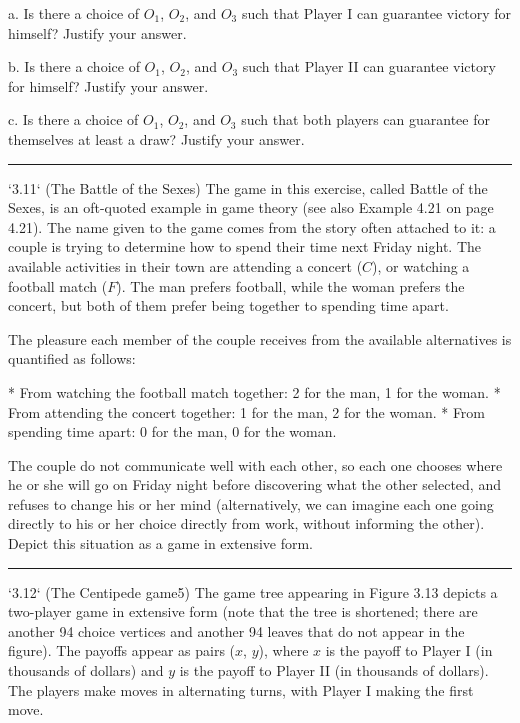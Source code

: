 \documentclass[10pt]{report}
\begin{document}
a. Is there a choice of $O_{1}$, $O_{2}$, and $O_{3}$ such that Player I can guarantee victory for himself? Justify your answer.

b. Is there a choice of $O_{1}$, $O_{2}$, and $O_{3}$ such that Player II can guarantee victory for himself? Justify your answer.

c. Is there a choice of $O_{1}$, $O_{2}$, and $O_{3}$ such that both players can guarantee for themselves at least a draw? Justify your answer.

\vspace{0.5cm}
\hrule
\vspace{0.5cm}
`3.11` (The Battle of the Sexes) The game in this exercise, called Battle of the Sexes, is an oft-quoted example in game theory (see also Example 4.21 on page 4.21). The name given to the game comes from the story often attached to it: a couple is trying to determine how to spend their time next Friday night. The available activities in their town are attending a concert ($C$), or watching a football match ($F$). The man prefers football, while the woman prefers the concert, but both of them prefer being together to spending time apart.

The pleasure each member of the couple receives from the available alternatives is quantified as follows:

* From watching the football match together: 2 for the man, 1 for the woman.
* From attending the concert together: 1 for the man, 2 for the woman.
* From spending time apart: 0 for the man, 0 for the woman.

The couple do not communicate well with each other, so each one chooses where he or she will go on Friday night before discovering what the other selected, and refuses to change his or her mind (alternatively, we can imagine each one going directly to his or her choice directly from work, without informing the other). Depict this situation as a game in extensive form.

\vspace{0.5cm}
\hrule
\vspace{0.5cm}
`3.12` (The Centipede game5) The game tree appearing in Figure 3.13 depicts a two-player game in extensive form (note that the tree is shortened; there are another 94 choice vertices and another 94 leaves that do not appear in the figure). The payoffs appear as pairs ($x$, $y$), where $x$ is the payoff to Player I (in thousands of dollars) and $y$ is the payoff to Player II (in thousands of dollars). The players make moves in alternating turns, with Player I making the first move.
\end{document}
